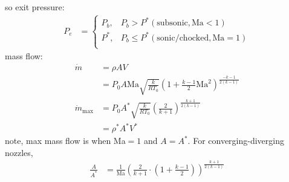 so exit pressure:
\begin{align*}
    P_e &= \begin{cases}
        P_b, & P_b > P^* (\text{subsonic}, \text{Ma}<1) \\
        P^*, & P_b \leq P^* (\text{sonic/chocked}, \text{Ma}=1) \\
    \end{cases}
\end{align*}
mass flow:
\begin{align*}
    \dot{m} &= \rho A V \\
    &= P_0 A \text{Ma} \sqrt{\frac{k}{R T_0}}\left(1 + \frac{k-1}{2} \text{Ma}^2\right)^{\frac{-k-1}{2(k-1)}} \\
    \dot{m}_\text{max} &= P_0 A^* \sqrt{\frac{k}{R T_0}}\left(\frac{2}{k+1}\right)^{\frac{k+1}{2(k-1)}} \\
    &= \rho^* A^* V^*
\end{align*}
note, max mass flow is when Ma$=1$ and $A = A^*$. For converging-diverging nozzles,
\begin{align*}
    \frac{A}{A^*} &= \frac{1}{\text{Ma}}\left(\frac{2}{k+1}\cdot \left(1 + \frac{k-1}{2}\right)\right)^{\frac{k+1}{2(k-1)}}
\end{align*}
